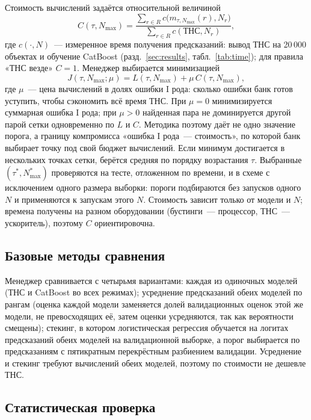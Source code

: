 \documentclass{misisarticle}
\begin{document}
Стоимость вычислений задаётся относительной величиной
\begin{equation}
\label{eq:C}
C(\tau,N_{\max})=\frac{\sum_{r\in R}c\bigl(m_{\tau,N_{\max}}(r),N_r\bigr)}{\sum_{r\in R}c(\text{ТНС},N_r)},
\end{equation}
где $c(\cdot,N)$~--- измеренное время получения предсказаний: вывод ТНС на 20\,000 объектах и обучение CatBoost (разд.~\ref{sec:results}, табл.~\ref{tab:time}); для правила «ТНС везде» $C=1$. Менеджер выбирается минимизацией
\begin{equation}
\label{eq:J}
J(\tau,N_{\max};\mu)=L(\tau,N_{\max})+\mu\,C(\tau,N_{\max}),
\end{equation}
где $\mu$~--- цена вычислений в долях ошибки I рода: сколько ошибки банк готов уступить, чтобы сэкономить всё время ТНС. При $\mu=0$ минимизируется суммарная ошибка I рода; при $\mu>0$ найденная пара не доминируется другой парой сетки одновременно по $L$ и $C$. Методика поэтому даёт не одно значение порога, а границу компромисса «ошибка I рода~--- стоимость», по которой банк выбирает точку под свой бюджет вычислений. Если минимум достигается в нескольких точках сетки, берётся средняя по порядку возрастания $\tau$. Выбранные $(\tau^{*},N_{\max}^{*})$ проверяются на тесте, отложенном по времени, и в схеме с исключением одного размера выборки: пороги подбираются без запусков одного $N$ и применяются к запускам этого $N$. Стоимость зависит только от модели и $N$; времена получены на разном оборудовании (бустинги~--- процессор, ТНС~--- ускоритель), поэтому $C$ ориентировочна.

\subsection{Базовые методы сравнения}

Менеджер сравнивается с четырьмя вариантами: каждая из одиночных моделей (ТНС и CatBoost во всех режимах); усреднение предсказаний обеих моделей по рангам (оценка каждой модели заменяется долей валидационных оценок этой же модели, не превосходящих её, затем оценки усредняются, так как вероятности смещены); стекинг, в котором логистическая регрессия обучается на логитах предсказаний обеих моделей на валидационной выборке, а порог выбирается по предсказаниям с пятикратным перекрёстным разбиением валидации. Усреднение и стекинг требуют вычислений обеих моделей, поэтому по стоимости не дешевле ТНС.

\subsection{Статистическая проверка}
\end{document}

